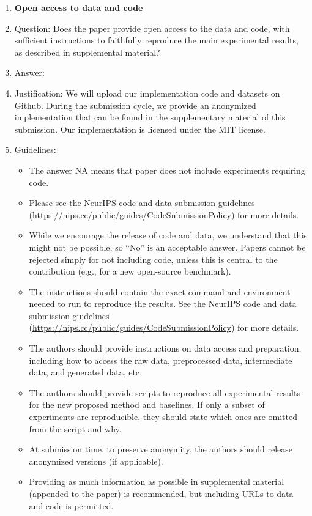 \documentclass{article}
\begin{document}
\begin{enumerate}
\item {\bf Open access to data and code}
    \item[] Question: Does the paper provide open access to the data and code, with sufficient instructions to faithfully reproduce the main experimental results, as described in supplemental material?
    \item[] Answer: \answerYes{} %
    \item[] Justification: We will upload our implementation code and datasets on Github. During the submission cycle, we provide an anonymized implementation that can be found in the supplementary material of this submission. Our implementation is licensed under the MIT license.
    \item[] Guidelines:
    \begin{itemize}
        \item The answer NA means that paper does not include experiments requiring code.
        \item Please see the NeurIPS code and data submission guidelines (\url{https://nips.cc/public/guides/CodeSubmissionPolicy}) for more details.
        \item While we encourage the release of code and data, we understand that this might not be possible, so “No” is an acceptable answer. Papers cannot be rejected simply for not including code, unless this is central to the contribution (e.g., for a new open-source benchmark).
        \item The instructions should contain the exact command and environment needed to run to reproduce the results. See the NeurIPS code and data submission guidelines (\url{https://nips.cc/public/guides/CodeSubmissionPolicy}) for more details.
        \item The authors should provide instructions on data access and preparation, including how to access the raw data, preprocessed data, intermediate data, and generated data, etc.
        \item The authors should provide scripts to reproduce all experimental results for the new proposed method and baselines. If only a subset of experiments are reproducible, they should state which ones are omitted from the script and why.
        \item At submission time, to preserve anonymity, the authors should release anonymized versions (if applicable).
        \item Providing as much information as possible in supplemental material (appended to the paper) is recommended, but including URLs to data and code is permitted.
    \end{itemize}



\end{enumerate}
\end{document}
